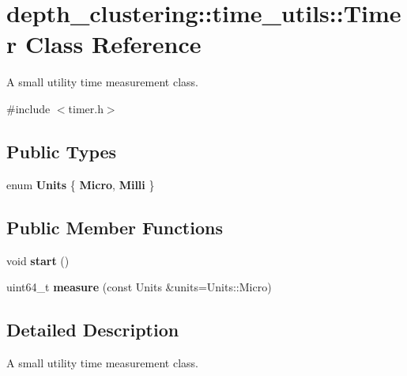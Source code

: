 \hypertarget{classdepth__clustering_1_1time__utils_1_1Timer}{\section{depth\-\_\-clustering\-:\-:time\-\_\-utils\-:\-:Timer Class Reference}
\label{classdepth__clustering_1_1time__utils_1_1Timer}
}


A small utility time measurement class.  




{\ttfamily \#include $<$timer.\-h$>$}

\subsection*{Public Types}
\begin{DoxyCompactItemize}
\item 
enum {\bfseries Units} \{ {\bfseries Micro}, 
{\bfseries Milli}
 \}
\end{DoxyCompactItemize}
\subsection*{Public Member Functions}
\begin{DoxyCompactItemize}
\item 
\hypertarget{classdepth__clustering_1_1time__utils_1_1Timer_a427c133e6773d0dc3c83cbdb9fceaf48}{void {\bfseries start} ()}\label{classdepth__clustering_1_1time__utils_1_1Timer_a427c133e6773d0dc3c83cbdb9fceaf48}

\item 
\hypertarget{classdepth__clustering_1_1time__utils_1_1Timer_a5d90ccad61e49c2dde4320c4df8d04f0}{uint64\-\_\-t {\bfseries measure} (const Units \&units=Units\-::\-Micro)}\label{classdepth__clustering_1_1time__utils_1_1Timer_a5d90ccad61e49c2dde4320c4df8d04f0}

\end{DoxyCompactItemize}


\subsection{Detailed Description}
A small utility time measurement class. 


